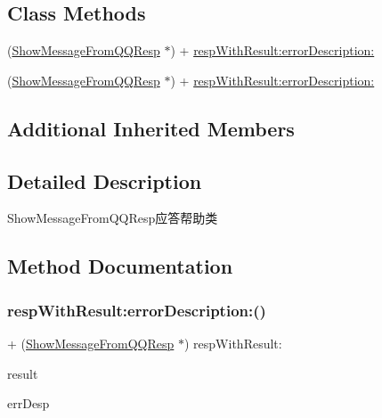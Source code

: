 \subsection*{Class Methods}
\begin{DoxyCompactItemize}
\item 
(\mbox{\hyperlink{interface_show_message_from_q_q_resp}{Show\+Message\+From\+Q\+Q\+Resp}} $\ast$) + \mbox{\hyperlink{interface_show_message_from_q_q_resp_a34158f51c1102cb5a75fb90eab156ad4}{resp\+With\+Result\+:error\+Description\+:}}
\item 
(\mbox{\hyperlink{interface_show_message_from_q_q_resp}{Show\+Message\+From\+Q\+Q\+Resp}} $\ast$) + \mbox{\hyperlink{interface_show_message_from_q_q_resp_a34158f51c1102cb5a75fb90eab156ad4}{resp\+With\+Result\+:error\+Description\+:}}
\end{DoxyCompactItemize}
\subsection*{Additional Inherited Members}


\subsection{Detailed Description}
Show\+Message\+From\+Q\+Q\+Resp应答帮助类 

\subsection{Method Documentation}
\mbox{\label{interface_show_message_from_q_q_resp_a34158f51c1102cb5a75fb90eab156ad4}} 
\subsubsection{\texorpdfstring{resp\+With\+Result\+:error\+Description\+:()}{respWithResult:errorDescription:()}\hspace{0.1cm}{\footnotesize\ttfamily [1/2]}}
{\footnotesize\ttfamily + (\mbox{\hyperlink{interface_show_message_from_q_q_resp}{Show\+Message\+From\+Q\+Q\+Resp}} $\ast$) resp\+With\+Result\+: \begin{DoxyParamCaption}\item[{(N\+S\+String $\ast$)}]{result }\item[{errorDescription:(N\+S\+String $\ast$)}]{err\+Desp }\end{DoxyParamCaption}}


